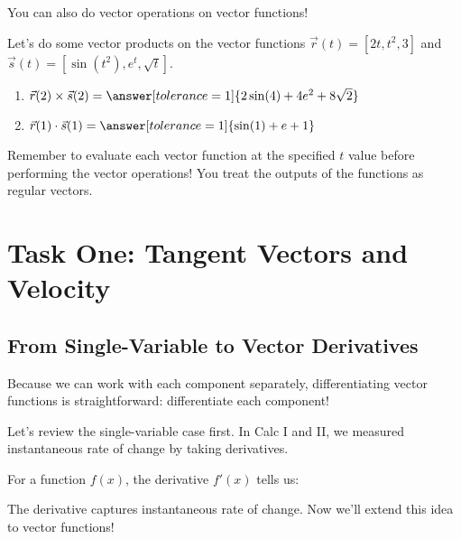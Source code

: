 \documentclass{ximera}
\begin{document}
You can also do vector operations on vector functions!

\begin{problem}
    Let's do some vector products on the vector functions $\vec{r}(t) = [ 2t, t^2, 3 ]$ and $\vec{s}(t) = [ \sin(t^2), e^t, \sqrt{t} ]$.
    \begin{enumerate}
        \item $\vec{r}(2)\times \vec{s}(2) = \answer[tolerance=1]{2\sin(4) + 4e^2 + 8\sqrt{2}}$
        \item $\vec{r}(1) \cdot \vec{s}(1) = \answer[tolerance=1]{\sin(1) + e + 1}$
    \end{enumerate}
    \begin{feedback}
    Remember to evaluate each vector function at the specified $t$ value before performing the vector operations! You treat the outputs of the functions as regular vectors.
    \end{feedback}
\end{problem}

\section*{Task One: Tangent Vectors and Velocity}

\subsection*{From Single-Variable to Vector Derivatives}

Because we can work with each component separately, differentiating vector functions is straightforward: differentiate each component!

\begin{problem}
Let's review the single-variable case first. In Calc I and II, we measured instantaneous rate of change by taking derivatives.

For a function $f(x)$, the derivative $f'(x)$ tells us:
\begin{selectAll}
\end{selectAll}

\begin{feedback}
The derivative captures instantaneous rate of change. Now we'll extend this idea to vector functions!
\end{feedback}
\end{problem}
\end{document}

